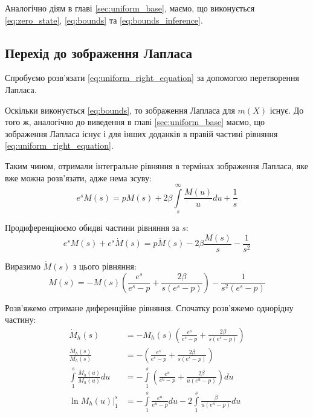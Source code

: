 Аналогічно діям в главі \ref{sec:uniform_base}, маємо, що виконується \eqref{eq:zero_state}, \eqref{eq:bounds} та \eqref{eq:bounds_inference}.

\subsection{Перехід до зображення Лапласа}
\label{sec:uniform_right_integral_laplace}

Спробуємо розв'язати \eqref{eq:uniform_right_equation} за допомогою перетворення Лапласа.

Оскільки виконується \eqref{eq:bounds}, то зображення Лапласа для $m(X)$ існує. До того ж, аналогічно до виведення в главі \ref{sec:uniform_base} маємо, що зображення Лапласа існує і для інших доданків в правій частині рівняння \eqref{eq:uniform_right_equation}.

Таким чином, отримали інтегральне рівняння в термінах зображення Лапласа, яке вже можна розв'язати, адже нема зсуву:
\begin{equation}
	\label{eq:uniform_right_laplace_integral}
	e^s M(s) = p M(s) + 2\beta \int\limits_s^\infty \frac{M(u)}{u} du + \frac{1}{s}
\end{equation}

Продиференціюємо обидві частини рівняння за $s$:
\begin{equation}
	e^s M(s) + e^s \dot M(s) =p \dot M(s) - 2 \beta \frac{M(s)}{s}  - \frac1{s^2}
\end{equation}

Виразимо $\dot M(s)$ з цього рівняння:
\begin{equation}
	\label{eq:uniform_right_laplace_diff}
	\dot M(s) = - M(s)\left(\frac{e^s}{e^s - p} + \frac{2\beta}{s(e^s - p)}\right) - \frac{1}{s^2(e^s - p)}
\end{equation}

Розв'яжемо отримане диференційне рівняння. Спочатку розв'яжемо однорідну частину:
\begin{align*}
	\dot M_h (s) &= - M_h (s)\left(\frac{e^s}{e^s - p} + \frac{2\beta}{s(e^s - p)}\right) \\
	\frac{\dot M_h (s)}{M_h (s)} &= -\left(\frac{e^s}{e^s - p} + \frac{2\beta}{s(e^s - p)}\right) \\
	\int\limits_1^s \frac{\dot M_h (u)}{M_h (u)} du &= -\int\limits_1^s \left(\frac{e^u}{e^u - p} + \frac{2\beta}{u(e^u - p)}\right) du \\
	\left. \ln{M_h (u)}\right|_1^s &= - \int\limits_1^s \frac{e^u}{e^u - p} du  - 2 \int\limits_1^s \frac{\beta}{u(e^u - p)} du
\end{align*}

